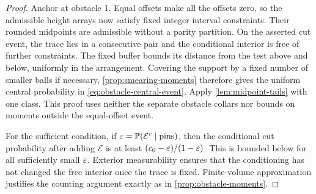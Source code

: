 \begin{proof}
Anchor at obstacle 1.  Equal offsets make all the offsets zero, so the
admissible height arrays now satisfy fixed integer interval constraints.
Their rounded midpoints are admissible without a parity partition.
On the asserted cut event, the trace lies in a consecutive pair and the
conditional interior is free of further constraints.  The fixed buffer
bounds its distance from the test above and below, uniformly in the
arrangement.  Covering the support by a fixed number of smaller balls
if necessary, \cref{prop:smearing-moments} therefore gives the uniform
central probability in \eqref{eq:obstacle-central-event}.  Apply
\cref{lem:midpoint-tails} with one class.  This proof uses
neither the separate obstacle collars nor bounds on moments outside the
equal-offset event.

For the sufficient condition, if
$\varepsilon=\mathbb P(\mathcal E^c\mid\hbox{pins})$, then the conditional cut probability
after adding $\mathcal E$ is at least $(c_0-\varepsilon)/(1-\varepsilon)$.
This is bounded below for all sufficiently small $\varepsilon$.  Exterior
measurability ensures that the conditioning has not changed the free
interior once the trace is fixed.  Finite-volume approximation justifies
the counting argument exactly as in \cref{prop:obstacle-moments}.
\end{proof}
